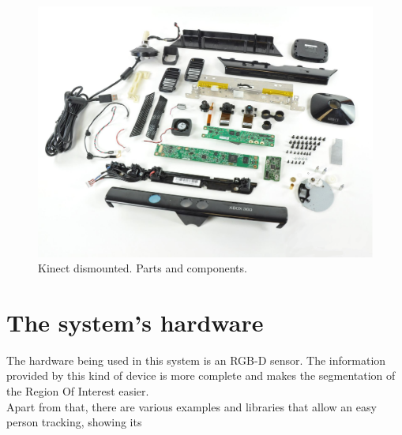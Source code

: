 \begin{figure}[h]
	\begin{center}
	\includegraphics[scale=0.2]{img/kinect/kinect_parts.eps}
	\caption[Kinect Parts]{Kinect dismounted. Parts and components.}
	\end{center}

\end{figure}


\section*{The system's hardware}

The hardware being used in this system is an RGB-D sensor. The information provided by this kind of device is more complete and makes the segmentation of the Region Of Interest easier. 
\\
Apart from that, there are various examples and libraries that allow an easy person tracking, showing its 
